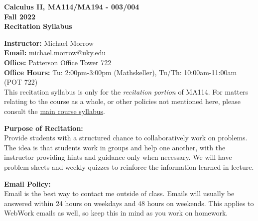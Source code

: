 \documentclass[12pt]{article}
\newcommand{\tbf}[1]{\noindent\textbf{#1}}
\begin{document}
\begin{center}
\Large{\textbf{Calculus II, MA114/MA194 - 003/004}}\\
\Large{\textbf{Fall 2022}}\\
\Large{\textbf{Recitation Syllabus}}
\end{center}

\vspace{0.5cm}

\tbf{Instructor:} Michael Morrow\\
\tbf{Email:} michael.morrow@uky.edu\\
\tbf{Office:} Patterson Office Tower 722\\
\tbf{Office Hours:} Tu: 2:00pm-3:00pm (Mathskeller), Tu/Th: 10:00am-11:00am (POT 722)\\


This recitation syllabus is only for the \emph{recitation portion} of MA114. For matters relating to the course as a whole, or other policies not mentioned here, please consult the \href{http://www.ms.uky.edu/~ma114/f.22/}{main course syllabus}.

\vspace{0.5cm}

\tbf{Purpose of Recitation:}\\
Provide students with a structured chance to collaboratively work on problems. The idea is that students work in groups and help one another, with the instructor providing hints and guidance only when necessary. We will have problem sheets and weekly quizzes to reinforce the information learned in lecture.

\vspace{0.5cm}

\tbf{Email Policy:} \\
Email is the best way to contact me outside of class. Emails will usually be answered within 24 hours on weekdays and 48 hours on weekends. This applies to WebWork emails as well, so keep this in mind as you work on homework.

\vspace{0.5cm}
\end{document}
